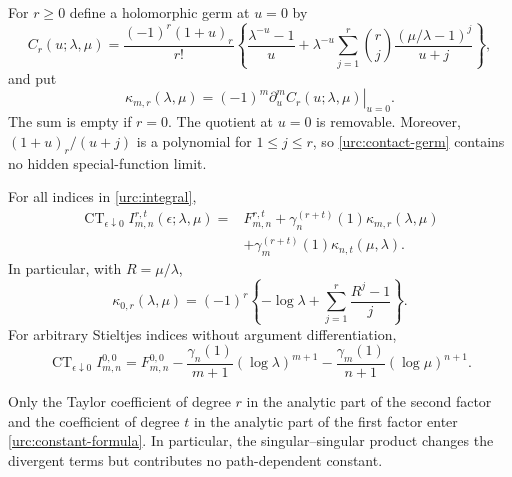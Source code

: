 For $r\ge0$ define a holomorphic germ at $u=0$ by
\begin{equation}\label{urc:contact-germ}
 C_r(u;\lambda,\mu)=\frac{(-1)^r(1+u)_r}{r!}
 \left\{\frac{\lambda^{-u}-1}{u}
 +\lambda^{-u}\sum_{j=1}^r
    \binom rj\frac{(\mu/\lambda-1)^j}{u+j}\right\},
\end{equation}
and put
\begin{equation}\label{urc:kappa}
 \kappa_{m,r}(\lambda,\mu)
 =(-1)^m\left.\partial_u^m C_r(u;\lambda,\mu)\right|_{u=0}.
\end{equation}
The sum is empty if $r=0$. The quotient at $u=0$ is removable.
Moreover, $(1+u)_r/(u+j)$ is a polynomial for $1\le j\le r$,
so \eqref{urc:contact-germ} contains no hidden special-function limit.

\begin{theorem}
\label{urc:constant-theorem}
For all indices in \eqref{urc:integral},
\begin{equation}\label{urc:constant-formula}
 \boxed{\begin{aligned}
 \operatorname{CT}_{\epsilon\downarrow0}
       I_{m,n}^{r,t}(\epsilon;\lambda,\mu)
 ={}&F_{m,n}^{r,t}
    +\gamma_n^{(r+t)}(1)\kappa_{m,r}(\lambda,\mu)\\
   &+\gamma_m^{(r+t)}(1)\kappa_{n,t}(\mu,\lambda).
 \end{aligned}}
\end{equation}
In particular, with $R=\mu/\lambda$,
\begin{equation}\label{urc:zeroth-contact}
 \boxed{\displaystyle
 \kappa_{0,r}(\lambda,\mu)
 =(-1)^r\left\{-\log\lambda+
                   \sum_{j=1}^r\frac{R^j-1}{j}\right\}.}
\end{equation}
For arbitrary Stieltjes indices without argument differentiation,
\begin{equation}\label{urc:no-argument-derivatives}
 \operatorname{CT}_{\epsilon\downarrow0}I_{m,n}^{0,0}
 =F_{m,n}^{0,0}
  -\frac{\gamma_n(1)}{m+1}(\log\lambda)^{m+1}
  -\frac{\gamma_m(1)}{n+1}(\log\mu)^{n+1}.
\end{equation}
\end{theorem}

Only the Taylor coefficient of degree $r$ in the analytic part of
the second factor and the coefficient of degree $t$ in the analytic
part of the first factor enter \eqref{urc:constant-formula}. In
particular, the singular--singular product changes the divergent
terms but contributes no path-dependent constant.

